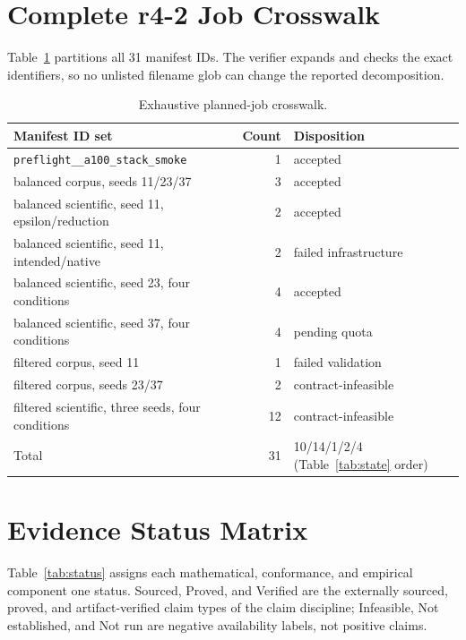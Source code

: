 \documentclass{article}
\begin{document}
\section{Complete r4-2 Job Crosswalk}

Table~\ref{tab:crosswalk} partitions all 31 manifest IDs.  The verifier expands
and checks the exact identifiers, so no unlisted filename glob can change the
reported decomposition.

\begin{table}[h]
  \centering
  \caption{Exhaustive planned-job crosswalk.}
  \label{tab:crosswalk}
  \small
  \begin{tabularx}{\linewidth}{Xrl}
    \toprule
    Manifest ID set & Count & Disposition \\
    \midrule
    \texttt{preflight\_\_a100\_stack\_smoke} & 1 & accepted \\
    balanced corpus, seeds 11/23/37 & 3 & accepted \\
    balanced scientific, seed 11, epsilon/reduction & 2 & accepted \\
    balanced scientific, seed 11, intended/native & 2 & failed infrastructure \\
    balanced scientific, seed 23, four conditions & 4 & accepted \\
    balanced scientific, seed 37, four conditions & 4 & pending quota \\
    filtered corpus, seed 11 & 1 & failed validation \\
    filtered corpus, seeds 23/37 & 2 & contract-infeasible \\
    filtered scientific, three seeds, four conditions & 12 & contract-infeasible \\
    \midrule
    Total & 31 & 10/14/1/2/4 (Table~\ref{tab:state} order) \\
    \bottomrule
  \end{tabularx}
\end{table}

\section{Evidence Status Matrix}

Table~\ref{tab:status} assigns each mathematical, conformance, and empirical
component one status.  Sourced, Proved, and Verified are the externally
sourced, proved, and artifact-verified claim types of the claim discipline;
Infeasible, Not established, and Not run are negative availability labels, not
positive claims.
\end{document}

